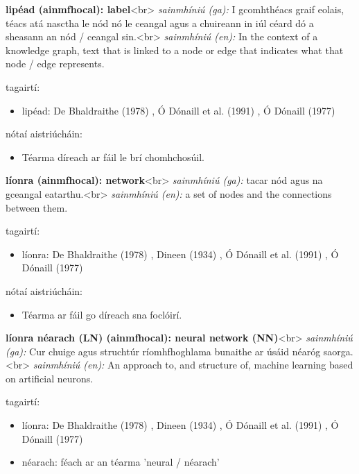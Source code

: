 \documentclass{article}
\begin{document}
\textbf{lipéad (ainmfhocal): label}<br>
\textit{sainmhíniú (ga):} I gcomhthéacs graif eolais, téacs atá nasctha le nód nó le ceangal agus a chuireann in iúl céard dó a sheasann an nód / ceangal sin.<br>
\textit{sainmhíniú (en):} In the context of a knowledge graph, text that is linked to a node or edge that indicates what that node / edge represents.

tagairtí:
\begin{itemize}
	\item lipéad: De Bhaldraithe (1978) \cite{de-bhaldraithe}, Ó Dónaill et al. (1991) \cite{focloir-beag}, Ó Dónaill (1977) \cite{odonaill}
\end{itemize}

nótaí aistriúcháin:
\begin{itemize}
	\item Téarma díreach ar fáil le brí chomhchosúil.
\end{itemize}


\textbf{líonra (ainmfhocal): network}<br>
\textit{sainmhíniú (ga):} tacar nód agus na gceangal eatarthu.<br>
\textit{sainmhíniú (en):} a set of nodes and the connections between them.

tagairtí:
\begin{itemize}
	\item líonra: De Bhaldraithe (1978) \cite{de-bhaldraithe}, Dineen (1934) \cite{dineen}, Ó Dónaill et al. (1991) \cite{focloir-beag}, Ó Dónaill (1977) \cite{odonaill}
\end{itemize}

nótaí aistriúcháin:
\begin{itemize}
	\item Téarma ar fáil go díreach sna foclóirí.
\end{itemize}


\textbf{líonra néarach (LN) (ainmfhocal): neural network (NN)}<br>
\textit{sainmhíniú (ga):} Cur chuige agus struchtúr ríomhfhoghlama bunaithe ar úsáid néaróg saorga.<br>
\textit{sainmhíniú (en):} An approach to, and structure of, machine learning based on artificial neurons.

tagairtí:
\begin{itemize}
	\item líonra: De Bhaldraithe (1978) \cite{de-bhaldraithe}, Dineen (1934) \cite{dineen}, Ó Dónaill et al. (1991) \cite{focloir-beag}, Ó Dónaill (1977) \cite{odonaill}
	\item néarach: féach ar an téarma 'neural / néarach'
\end{itemize}
\end{document}
